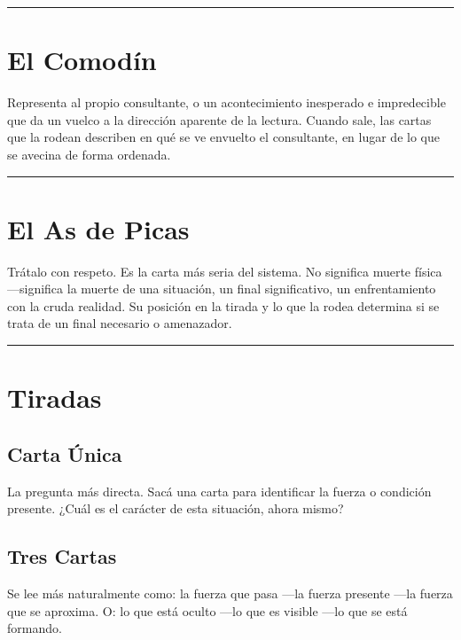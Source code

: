 \begin{center}\rule{0.5\linewidth}{0.5pt}\end{center}

\section{El Comodín}\label{the-joker}

Representa al propio consultante, o un acontecimiento inesperado e impredecible que da un vuelco a la dirección aparente de la lectura. Cuando sale, las cartas que la rodean describen en qué se ve envuelto el consultante, en lugar de lo que se avecina de forma ordenada.

\begin{center}\rule{0.5\linewidth}{0.5pt}\end{center}

\section{El As de Picas}\label{the-ace-of-spades}

Trátalo con respeto. Es la carta más seria del sistema. No significa muerte física ---significa la muerte de una situación, un final significativo, un enfrentamiento con la cruda realidad. Su posición en la tirada y lo que la rodea determina si se trata de un final necesario o amenazador.

\begin{center}\rule{0.5\linewidth}{0.5pt}\end{center}

\section{Tiradas}\label{spreads}

\subsection{Carta Única}\label{single-card}

La pregunta más directa. Sacá una carta para identificar la fuerza o condición presente. ¿Cuál es el carácter de esta situación, ahora mismo?

\subsection{Tres Cartas}\label{three-card}

Se lee más naturalmente como: la fuerza que pasa ---la fuerza presente ---la fuerza que se aproxima. O: lo que está oculto ---lo que es visible ---lo que se está formando.

